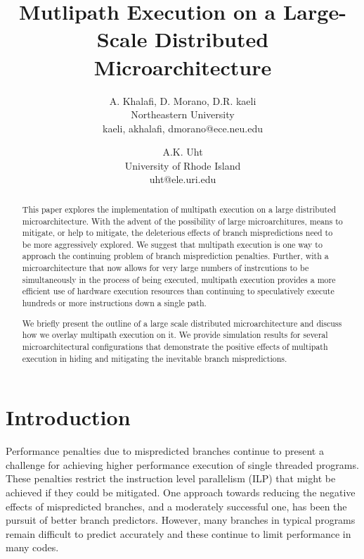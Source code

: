 \documentclass[10pt,dvips]{article}
\begin{document}
\parskip 3mm
%
%
\title{Mutlipath Execution on a Large-Scale Distributed 
Microarchitecture}
%
\author{
A. Khalafi, D. Morano, D.R. kaeli\\
Northeastern University\\
{kaeli, akhalafi, dmorano}@ece.neu.edu\\
\and
A.K. Uht \\
University of Rhode Island\\ uht@ele.uri.edu
}
%
\maketitle
\thispagestyle{empty}
%
\begin{abstract}
This paper explores the implementation of multipath execution on a
large distributed microarchitecture.  With the advent of the
possibility of large microarchitures, means to mitigate, or help to
mitigate, the deleterious effects of branch mispredictions need to be
more aggressively explored.  We suggest that multipath execution is one
way to approach the continuing problem of branch misprediction
penalties.  Further, with a microarchitecture that now allows for very
large numbers of instrcutions to be simultaneously in the process of
being executed, multipath execution provides a more efficient use of
hardware execution resources than continuing to speculatively execute
hundreds or more instructions down a single path.

We briefly present the outline of a large scale distributed microarchitecture
and discuss how we overlay multipath execution on it.
We provide simulation results for several microarchitectural configurations
that demonstrate the positive effects of multipath execution in
hiding and mitigating the inevitable branch mispredictions.
\end{abstract}
%
\section{Introduction}
%
Performance penalties due to mispredicted branches continue to
present a challenge for achieving higher performance execution
of single threaded programs.
These penalties restrict the instruction level parallelism (ILP)
that might be achieved if they could be mitigated.
One approach towards reducing the negative effects of mispredicted
branches, and a moderately successful one, has been the pursuit
of better branch predictors.  However, many branches in typical
programs remain difficult to predict accurately and these continue
to limit performance in many codes.
\end{document}
